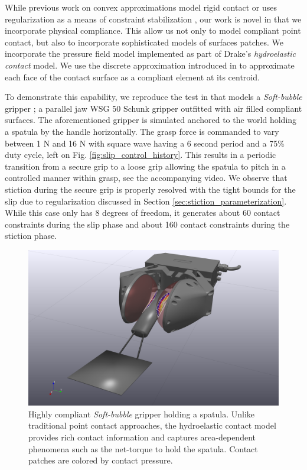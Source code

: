 While previous work on convex approximations model rigid contact
\cite{bib:anitescu2006,bib:mazhar2014} or uses regularization as a means of
constraint stabilization \cite{bib:todorov2014}, our work is novel in that we
incorporate physical compliance. This allow us not only to model compliant point
contact, but also to incorporate sophisticated models of surfaces patches. We
incorporate the pressure field model \cite{bib:elandt2019pressure} implemented
as part of Drake's \cite{bib:drake} \emph{hydroelastic contact} model. We use
the discrete approximation introduced in 
to approximate each face of the contact surface as a compliant element at its
centroid.

To demonstrate this capability, we reproduce the test in  that models a \emph{Soft-bubble} gripper
\cite{bib:kuppuswamy2020soft}; a parallel jaw WSG 50 Schunk gripper outfitted
with air filled compliant surfaces. The aforementioned gripper is simulated
anchored to the world holding a spatula by the handle horizontally. The grasp
force is commanded to vary between 1 N and 16 N with square wave having a 6
second period and a 75\% duty cycle, left on Fig.
\ref{fig:slip_control_history}. This results in a periodic transition from a
secure grip to a loose grip allowing the spatula to pitch in a controlled manner
within grasp, see the accompanying video. We observe that stiction during the
secure grip is properly resolved with the tight bounds for the slip due to
regularization discussed in Section \ref{sec:stiction_parameterization}. While
this case only has 8 degrees of freedom, it generates about 60 contact
constraints during the slip phase and about 160 contact constraints during the
stiction phase.

\begin{figure}[!h]
	\centering
	\includegraphics[width=0.9\columnwidth]{figures/slip_control/slip_control_single_frame.png}
	\caption{\label{fig:slip_control_frame} 
	Highly compliant \emph{Soft-bubble} gripper \cite{bib:kuppuswamy2020soft}
	holding a spatula. Unlike traditional point contact approaches, the
	hydroelastic contact model provides rich contact information and captures
	area-dependent phenomena such as the net-torque to hold the spatula. Contact
	patches are colored by contact pressure.}
\end{figure}

